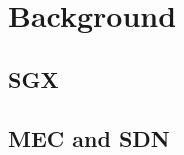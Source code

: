 \section{Background}\label{sec_background}


\subsection{SGX}\label{sec_sgx}


\subsection{MEC and SDN}\label{sec_mec}



